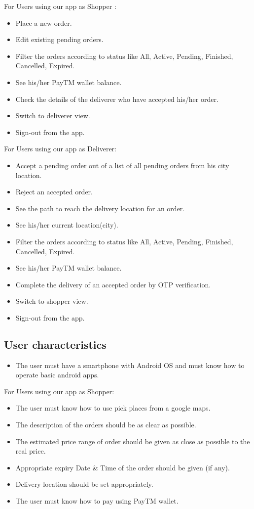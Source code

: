 \documentclass{report}
\begin{document}
For Users using our app as Shopper :
\begin{itemize}[label=$\circ$]
\item Place a new order.
\item Edit existing pending orders.
\item Filter the orders according to status like All, Active, Pending, Finished, Cancelled, Expired.
\item See his/her PayTM wallet balance.
\item Check the details of the deliverer who have accepted his/her order.
\item Switch to deliverer view.
\item Sign-out from the app.
\end{itemize}

For Users using our app as Deliverer:
\begin{itemize}[label=$\diamond$]
\item Accept a pending order out of a list of all pending orders from his city location.
\item Reject an accepted order.
\item See the path to reach the delivery location for an order.
\item See his/her current location(city).
\item Filter the orders according to status like All, Active, Pending, Finished, Cancelled, Expired.
\item See his/her PayTM wallet balance.
\item Complete the delivery of an accepted order by OTP verification. 
\item Switch to shopper view.
\item Sign-out from the app.
\end{itemize}

\subsection{User characteristics}
\begin{itemize}
\item The user must have a smartphone with Android OS and must know how to operate basic android apps.
\end{itemize}

For Users using our app as Shopper:
\begin{itemize}[label=$\diamond$]
\item The user must know how to use pick places from a google maps.
\item The description of the orders should be as clear as possible.
\item The estimated price range of order should be given as close as possible to the real price.
\item Appropriate expiry Date \& Time of the order should be given (if any).
\item Delivery location should be set appropriately. 
\item The user must know how to pay using PayTM wallet.
\end{itemize}
\end{document}
